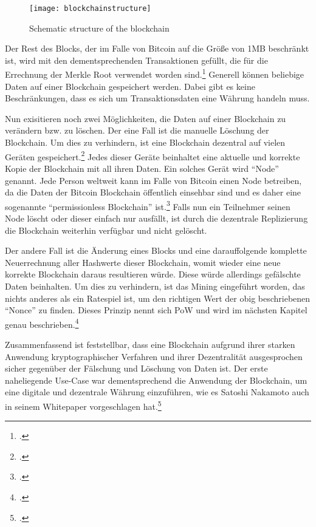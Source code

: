 \begin{figure}[H]
    \caption{Schematic structure of the blockchain}
    \texttt{[image: blockchainstructure]}
    \label{figure:blockchainstructure}
    \\
    \cite[Source: Based on][p. 5]{nakamoto2008bitcoin}
\end{figure}

Der Rest des Blocks, der im Falle von Bitcoin auf die Größe von 1MB beschränkt ist, wird mit den dementsprechenden
Transaktionen gefüllt, die für die Errechnung der Merkle Root verwendet worden sind.\footcite[Cf.][p. 746]{mukhopadhyay2016brief}
Generell können beliebige Daten auf einer Blockchain gespeichert werden. Dabei gibt es keine Beschränkungen, dass
es sich um Transaktionsdaten eine Währung handeln muss.

Nun exisitieren noch zwei Möglichkeiten, die Daten auf einer Blockchain zu verändern bzw. zu löschen. Der eine Fall
ist die manuelle Löschung der Blockchain. Um dies zu verhindern, ist eine Blockchain dezentral auf vielen Geräten
gespeichert.\footcite[Cf.][p. 46]{bhaskar2015bitcoin} Jedes dieser Geräte beinhaltet eine aktuelle und korrekte Kopie
der Blockchain mit all ihren Daten. Ein solches Gerät wird "`Node"' genannt. Jede Person weltweit kann im Falle von
Bitcoin einen Node betreiben, da die Daten der Bitcoin Blockchain öffentlich einsehbar sind und es daher eine
sogenannte "`permissionless Blockchain"' ist.\footcite[Cf.][p. 132]{courtois2014optimizing} Falls nun ein Teilnehmer
seinen Node löscht oder dieser einfach nur ausfällt, ist durch die dezentrale Replizierung die Blockchain weiterhin
verfügbar und nicht gelöscht.

Der andere Fall ist die Änderung eines Blocks und eine darauffolgende komplette Neuerrechnung aller Hashwerte dieser
Blockchain, womit wieder eine neue korrekte Blockchain daraus resultieren würde. Diese würde allerdings gefälschte Daten
beinhalten. Um dies zu verhindern, ist das Mining eingeführt worden, das nichts anderes als ein Ratespiel ist, um den
richtigen Wert der obig beschriebenen "`Nonce"' zu finden. Dieses Prinzip nennt sich \ac{PoW} und wird im nächsten Kapitel
genau beschrieben.\footcite[Cf.][p. 3]{nakamoto2008bitcoin}

Zusammenfassend ist feststellbar, dass eine Blockchain aufgrund ihrer starken Anwendung kryptographischer Verfahren und
ihrer Dezentralität ausgesprochen sicher gegenüber der Fälschung und Löschung von Daten ist. Der erste naheliegende
Use-Case war dementsprechend die Anwendung der Blockchain, um eine digitale und dezentrale Währung einzuführen, wie es
Satoshi Nakamoto auch in seinem Whitepaper vorgeschlagen hat.\footcite[Cf.][]{nakamoto2008bitcoin}

